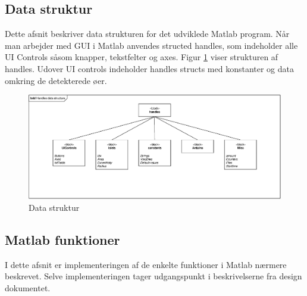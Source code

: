 \newpage
\subsection{Data struktur} \label{software_datastruktur}
Dette afsnit beskriver data strukturen for det udviklede Matlab program. Når man arbejder med GUI i Matlab anvendes structed handles, som indeholder alle UI Controls såsom knapper, tekstfelter og axes. Figur \ref{fig:handles} viser strukturen af handles. Udover UI controls indeholder handles structs med konstanter og data omkring de detekterede øer. 
\begin{figure}[H]
	\centering
	\includegraphics[width=1\textwidth]{billeder/software/handles-crop.pdf}
	\caption{Data struktur}
	\label{fig:handles}
\end{figure}

\newpage
\subsection{Matlab funktioner}
I dette afsnit er implementeringen af de enkelte funktioner i Matlab nærmere beskrevet. Selve implementeringen tager udgangspunkt i beskrivelserne fra design dokumentet. %






 
\newpage

